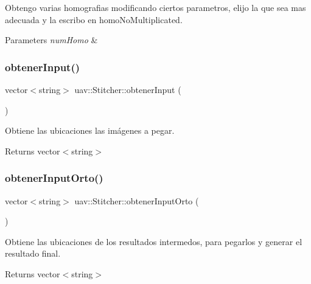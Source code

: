 Obtengo varias homografias modificando ciertos parametros, elijo la que sea mas adecuada y la escribo en homo\+No\+Multiplicated. 


\begin{DoxyParams}{Parameters}
{\em num\+Homo} & \\
\hline
\end{DoxyParams}
\mbox{\label{classuav_1_1Stitcher_a33521f40ecd0a4b57e3433b32c33f872}} 
\subsubsection{\texorpdfstring{obtener\+Input()}{obtenerInput()}}
{\footnotesize\ttfamily vector$<$string$>$ uav\+::\+Stitcher\+::obtener\+Input (\begin{DoxyParamCaption}{ }\end{DoxyParamCaption})\hspace{0.3cm}{\ttfamily [inline]}}



Obtiene las ubicaciones las imágenes a pegar. 

\begin{DoxyReturn}{Returns}
vector$<$string$>$ 
\end{DoxyReturn}
\mbox{\label{classuav_1_1Stitcher_a4a31cc35b3bc69697cdaa8094d4490b8}} 
\subsubsection{\texorpdfstring{obtener\+Input\+Orto()}{obtenerInputOrto()}}
{\footnotesize\ttfamily vector$<$string$>$ uav\+::\+Stitcher\+::obtener\+Input\+Orto (\begin{DoxyParamCaption}{ }\end{DoxyParamCaption})\hspace{0.3cm}{\ttfamily [inline]}}



Obtiene las ubicaciones de los resultados intermedos, para pegarlos y generar el resultado final. 

\begin{DoxyReturn}{Returns}
vector$<$string$>$ 
\end{DoxyReturn}
\mbox{\label{classuav_1_1Stitcher_a2f5433b17c42c874359f7f92148b4ee2}} 
